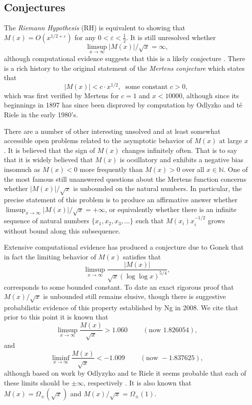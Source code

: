 \documentclass[11pt,reqno,a4letter]{article}
\numberwithin{figure}{section}
\numberwithin{table}{section}
\newcommand{\cf}{\textit{cf.\ }}
\theoremstyle{plain}
\numberwithin{theorem}{section}
\theoremstyle{definition}
\begin{document}
\subsection{Conjectures} 

The \emph{Riemann Hypothesis} (RH) is equivalent to showing that 
$M(x) = O\left(x^{1/2+\varepsilon}\right)$ for any 
$0 < \varepsilon < \frac{1}{2}$. 
It is still unresolved whether 
\[ 
\limsup_{x\rightarrow\infty} |M(x)| / \sqrt{x} = \infty, 
\] 
although computational evidence suggests that this is a likely conjecture 
\cite{ORDER-MERTENSFN,HURST-2017}. 
There is a rich history to the original statement of the \emph{Mertens conjecture} which 
states that 
\[ 
|M(x)| < c \cdot x^{1/2},\ \text{ some constant $c > 0$, }
\] 
which was first verified by Mertens for $c = 1$ and $x < 10000$, 
although since its beginnings in 1897 has since been disproved by computation by 
Odlyzko and t\'{e} Riele in the early 1980's. 

There are a number of other interesting unsolved and at 
least somewhat accessible open problems 
related to the asymptotic behavior of $M(x)$ at large $x$. 
It is believed that the sign of $M(x)$ changes infinitely often. 
That is to say that it is widely believed that $M(x)$ is 
ocsillatory and exhibits a negative bias insomuch as 
$M(x) < 0$ more frequently than $M(x) > 0$ over all 
$x \in \mathbb{N}$. 
One of the most famous still unanswered questions about the Mertens 
function concerns whether $|M(x)| / \sqrt{x}$ is unbounded on the 
natural numbers. In particular, the precise statement of this 
problem is to produce an affirmative answer whether 
$\limsup_{x \rightarrow \infty} |M(x)| / \sqrt{x} = +\infty$, or 
equivalently whether there is an infinite sequence of natural numbers 
$\{x_1, x_2, x_3, \ldots\}$ such that $M(x_i) x_i^{-1/2}$ grows without 
bound along this subsequence. 

Extensive computational evidence has produced 
a conjecture due to Gonek that in fact the limiting behavior of 
$M(x)$ satisfies 
that $$\limsup_{x \rightarrow \infty} \frac{|M(x)|}{\sqrt{x} 
(\log\log x)^{5/4}},$$ 
corresponds to some bounded constant. 
To date an exact rigorous 
proof that $M(x) / \sqrt{x}$ is unbounded still remains elusive, though there is suggestive probabilistic 
evidence of this property established by Ng in 2008. 
We cite that prior to this point it is known that \cite[\cf \S 4.1]{PRIMEREC} 
\[
\limsup_{x\rightarrow\infty} \frac{M(x)}{\sqrt{x}} > 1.060\ \qquad (\text{now } 1.826054), 
\] 
and 
\[ 
\liminf_{x\rightarrow\infty} \frac{M(x)}{\sqrt{x}} < -1.009\ \qquad (\text{now } -1.837625), 
\] 
although based on work by Odlyzyko and te Riele it seems probable that 
each of these limits should be $\pm \infty$, respectively 
\cite{ODLYZ-TRIELE,MREVISITED,ORDER-MERTENSFN,HURST-2017}. 
It is also known that $M(x) = \Omega_{\pm}(\sqrt{x})$ and 
$M(x) / \sqrt{x} = \Omega_{\pm}(1)$. 
\end{document}
